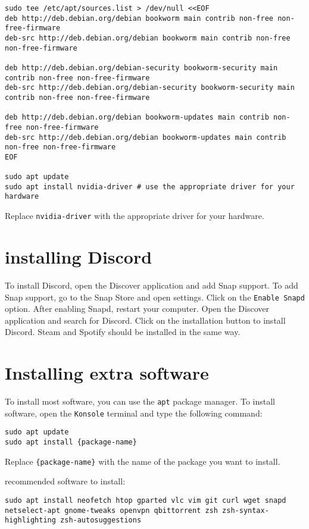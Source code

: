 \begin{lstlisting}
sudo tee /etc/apt/sources.list > /dev/null <<EOF
deb http://deb.debian.org/debian bookworm main contrib non-free non-free-firmware
deb-src http://deb.debian.org/debian bookworm main contrib non-free non-free-firmware

deb http://deb.debian.org/debian-security bookworm-security main contrib non-free non-free-firmware
deb-src http://deb.debian.org/debian-security bookworm-security main contrib non-free non-free-firmware

deb http://deb.debian.org/debian bookworm-updates main contrib non-free non-free-firmware
deb-src http://deb.debian.org/debian bookworm-updates main contrib non-free non-free-firmware
EOF

sudo apt update
sudo apt install nvidia-driver # use the appropriate driver for your hardware
\end{lstlisting}

Replace \texttt{nvidia-driver} with the appropriate driver for your hardware.

\section{installing Discord}

To install Discord, open the Discover application and add Snap support. To add Snap support, go to the Snap Store and open settings. Click on the \texttt{Enable Snapd} option. After enabling Snapd, restart your computer. Open the Discover application and search for Discord. Click on the installation button to install Discord. Steam and Spotify should be installed in the same way. 

\section{Installing extra software}

To install most software, you can use the \texttt{apt} package manager. To install software, open the \texttt{Konsole} terminal and type the following command:

\begin{lstlisting}
sudo apt update
sudo apt install {package-name}
\end{lstlisting}

Replace \texttt{\{package-name\}} with the name of the package you want to install.

recommended software to install:

\begin{lstlisting}
sudo apt install neofetch htop gparted vlc vim git curl wget snapd netselect-apt gnome-tweaks openvpn qbittorrent zsh zsh-syntax-highlighting zsh-autosuggestions 
\end{lstlisting}

